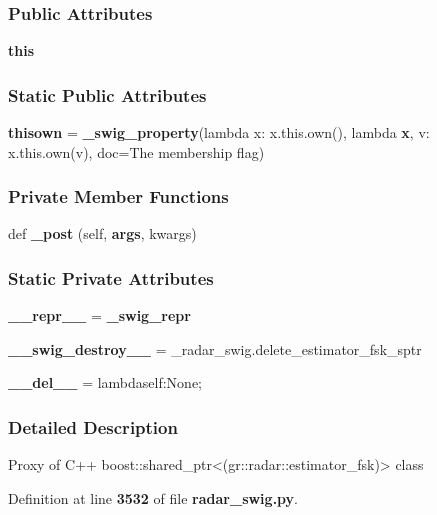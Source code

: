 \subsubsection*{Public Attributes}
\begin{DoxyCompactItemize}
\item 
{\bf this}
\end{DoxyCompactItemize}
\subsubsection*{Static Public Attributes}
\begin{DoxyCompactItemize}
\item 
{\bf thisown} = {\bf \+\_\+swig\+\_\+property}(lambda x\+: x.\+this.\+own(), lambda {\bf x}, v\+: x.\+this.\+own(v), doc=\textquotesingle{}The membership flag\textquotesingle{})
\end{DoxyCompactItemize}
\subsubsection*{Private Member Functions}
\begin{DoxyCompactItemize}
\item 
def {\bf \+\_\+post} (self, {\bf args}, kwargs)
\end{DoxyCompactItemize}
\subsubsection*{Static Private Attributes}
\begin{DoxyCompactItemize}
\item 
{\bf \+\_\+\+\_\+repr\+\_\+\+\_\+} = {\bf \+\_\+swig\+\_\+repr}
\item 
{\bf \+\_\+\+\_\+swig\+\_\+destroy\+\_\+\+\_\+} = \+\_\+radar\+\_\+swig.\+delete\+\_\+estimator\+\_\+fsk\+\_\+sptr
\item 
{\bf \+\_\+\+\_\+del\+\_\+\+\_\+} = lambdaself\+:\+None;
\end{DoxyCompactItemize}


\subsubsection{Detailed Description}
\begin{DoxyVerb}Proxy of C++ boost::shared_ptr<(gr::radar::estimator_fsk)> class\end{DoxyVerb}
 

Definition at line {\bf 3532} of file {\bf radar\+\_\+swig.\+py}.



